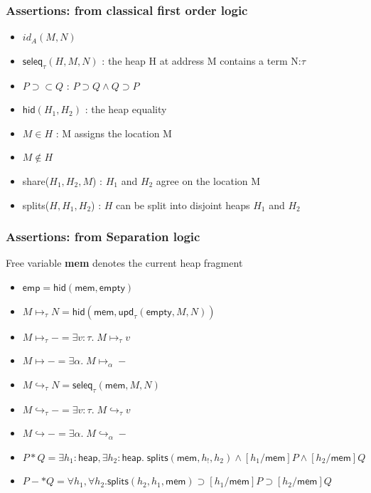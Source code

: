 \documentclass[xcolor=dvipsnames,9pt,hide notes,mathserif]{beamer}
\newcommand{\emp}{\ensuremath{\mathsf{emp}}}
\newcommand{\heap}{\ensuremath{\mathsf{heap}}}
\newcommand{\mem}{\ensuremath{\mathsf{mem}}}
\newcommand{\hid}{\ensuremath{\mathsf{hid}}}
\newcommand{\upd}{\ensuremath{\mathsf{upd}}}
\newcommand{\seleq}{\ensuremath{\mathsf{seleq}}}
\renewcommand{\empty}{\ensuremath{\mathsf{empty}}}
\newcommand{\splits}{\ensuremath{\mathsf{splits}}}
\begin{document}
\begin{frame}
  \frametitle{Assertions: from classical first order logic}
  \begin{itemize}
  \item $id_A(M,N)$
  \item $\seleq_\tau(H, M, N)$ : the heap H at address M contains a term N:$\tau$
  \item $P \supset \subset Q$ : $P \supset Q \wedge Q \supset P$
  \item $\hid(H_1, H_2)$ : the heap equality
  \item $M \in H$ : M assigns the location M 
  \item $M \notin H$
  \item share($H_1, H_2, M$) : $H_1$ and $H_2$ agree on the location M
  \item splits($H, H_1, H_2$) : $H$ can be split into disjoint heaps $H_1$ and $H_2$
  \end{itemize}
\end{frame}




\begin{frame}
  \frametitle{Assertions: from Separation logic}
Free variable {\bf mem} denotes the current heap fragment
  \begin{itemize}
  \item $\emp = \hid(\mem,\empty)$
  \item $M \mapsto_\tau N = \hid(\mem, \upd_\tau(\empty, M, N))$
  \item $M \mapsto_\tau - = \exists v{:} \tau.\; M \mapsto_\tau v$
  \item $M \mapsto - = \exists \alpha.\; M \mapsto_\alpha -$
  \item $M \hookrightarrow_\tau N = \seleq_\tau(\mem, M,N)$
  \item $M \hookrightarrow_\tau - = \exists v{:}\tau.\; M \hookrightarrow_\tau v$
  \item $M \hookrightarrow - = \exists \alpha. \;M \hookrightarrow_\alpha -$
  \item $P \ast Q = \exists h_1: \heap, \exists h_2:\heap. \;
    \splits(\mem, h_!, h_2) \wedge [h_1/\mem] P \wedge [h_2/\mem]Q$
  \item $P -\ast Q = \forall h_1, \forall h_2. \splits(h_2, h_1, \mem) \supset [h_1/\mem] P \supset [h_2/\mem]Q$
  \end{itemize}
\end{frame}
\end{document}
